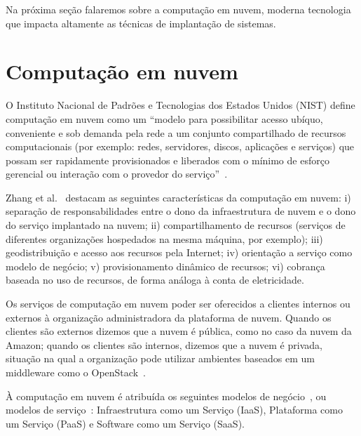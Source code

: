 Na próxima seção falaremos sobre a computação em nuvem,
moderna tecnologia que impacta altamente as técnicas de implantação de sistemas.

\section{Computação em nuvem}
\label{sec:cloud}

O Instituto Nacional de Padrões e Tecnologias dos Estados Unidos (NIST) define computação em nuvem como um ``modelo para possibilitar acesso ubíquo, conveniente e sob demanda pela rede a um conjunto compartilhado de recursos computacionais (por exemplo: redes, servidores, discos, aplicações e serviços) que possam ser rapidamente provisionados e liberados com o mínimo de esforço gerencial ou interação com o provedor do serviço''~\cite{Nist2011Cloud}. 

Zhang et al.~\cite{Zhang2010Cloud} destacam as seguintes características da computação em nuvem: i) separação de responsabilidades entre o dono da infraestrutura de nuvem e o dono do serviço implantado na nuvem; ii) compartilhamento de recursos (serviços de diferentes organizações hospedados na mesma máquina, por exemplo); iii) geodistribuição e acesso aos recursos pela Internet; iv) orientação a serviço como modelo de negócio; v) provisionamento dinâmico de recursos; vi) cobrança baseada no uso de recursos, de forma análoga à conta de eletricidade.

Os serviços de computação em nuvem poder ser oferecidos a clientes internos ou externos à organização administradora da plataforma de nuvem. Quando os clientes são externos dizemos que a nuvem é pública, como no caso da nuvem da Amazon; quando os clientes são internos, dizemos que a nuvem é privada, situação na qual a organização pode utilizar ambientes baseados em um middleware como o OpenStack~\cite{Zhang2010Cloud}.

À computação em nuvem é atribuída os seguintes modelos de negócio~\cite{Zhang2010Cloud}, ou modelos de serviço~\cite{Nist2011Cloud}: Infraestrutura como um Serviço (IaaS), Plataforma como um Serviço (PaaS) e Software como um Serviço (SaaS). 

